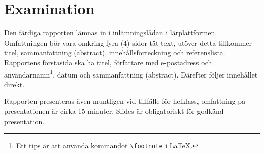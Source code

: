 \documentclass[a4paper]{miunasgn}
\begin{document}
\begin{comment}
Compare two types of equipment. You can for example design a home network from 
a given set of specifications or suggest changes in your company’s network.  
Compare alternative solutions and recommend one of them. Test some of the 
equipment and describe how it is configured and installed. Draw your own 
conclusions about the advantages and disadvantages of the solution proposed 
when compared to the others. Criticize the producer marketing motivation and 
policy.

Compare two data communications services, for example two Internet or broadband 
suppliers or two wireless communication services. Describe the technical 
differences, test them yourself and make a questionnaire to get opinion from 
other users, or interview the suppliers about their future plans. Criticize the 
suppliers about their marketing policy.
\end{comment}


\section{Examination}
\noindent
Den färdiga rapporten lämnas in i inlämningslådan i lärplattformen.
Omfattningen bör vara omkring fyra (4) sidor tät text, utöver detta tillkommer 
titel, sammanfattning (abstract), innehållsförteckning och referenslista.
Rapportens förstasida ska ha titel, författare med e-postadress och 
användarnamn\footnote{%
	Ett tips är att använda kommandot \texttt{\textbackslash footnote} i \LaTeX.
}, datum och sammanfattning (abstract).
Därefter följer innehållet direkt.

Rapporten presenteras även muntligen vid tillfälle för helklass, omfattning på 
presentationen är cirka 15 minuter.
Slides är obligatoriskt för godkänd presentation.



\end{document}
